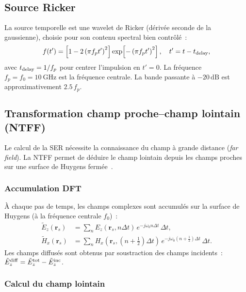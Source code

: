\documentclass[12pt,a4paper]{article}
\newcommand{\dt}{\Delta t}
\newcommand{\half}{\tfrac{1}{2}}
\begin{document}
\subsection{Source Ricker}
\label{ssec:ricker}

La source temporelle est une wavelet de Ricker (dérivée seconde de la gaussienne),
choisie pour son contenu spectral bien contrôlé~:
\begin{equation}
    f(t') = \left[1 - 2\left(\pi f_p t'\right)^2\right]
    \exp\!\left[-\left(\pi f_p t'\right)^2\right], \quad t' = t - t_{\rm delay},
    \label{eq:ricker}
\end{equation}
avec $t_{\rm delay} = 1/f_p$ pour centrer l'impulsion en $t'=0$.
La fréquence $f_p = f_0 = \SI{10}{\giga\hertz}$ est la fréquence centrale.
La bande passante à $-20\,\mathrm{dB}$ est approximativement $2.5\,f_p$.

\subsection{Transformation champ proche--champ lointain (NTFF)}
\label{ssec:ntff}

Le calcul de la SER nécessite la connaissance du champ à grande distance (\textit{far field}).
La NTFF permet de déduire le champ lointain depuis les champs proches sur une surface
de Huygens fermée~\cite{Taflove2005,Balanis2005}.

\subsubsection{Accumulation DFT}

À chaque pas de temps, les champs complexes sont accumulés sur la surface de Huygens
(à la fréquence centrale $f_0$)~:
\begin{align}
    \tilde{E}_z(\bm{r}_s) &= \sum_n E_z(\bm{r}_s, n\dt)\,e^{-j\omega_0 n\dt}\,\dt, \\
    \tilde{H}_x(\bm{r}_s) &= \sum_n H_x(\bm{r}_s, (n+\half)\dt)\,
                              e^{-j\omega_0 (n+\half)\dt}\,\dt.
    \label{eq:ntff-dft}
\end{align}
Les champs diffusés sont obtenus par soustraction des champs incidents~:
$\tilde{E}_z^{\rm diff} = \tilde{E}_z^{\rm tot} - \tilde{E}_z^{\rm inc}$.

\subsubsection{Calcul du champ lointain}
\end{document}
